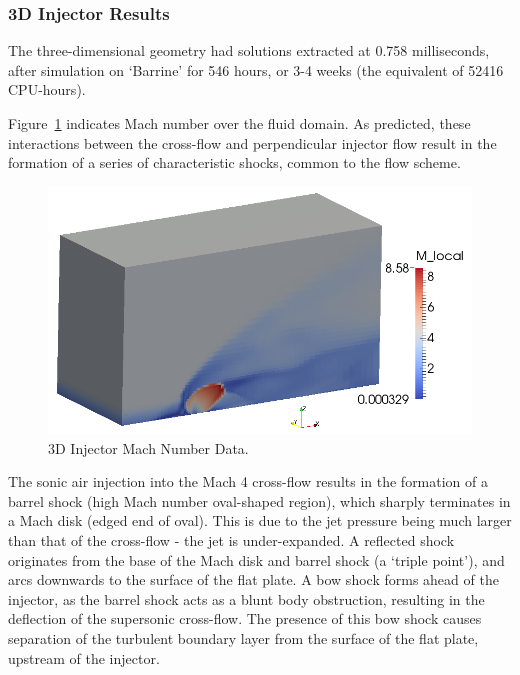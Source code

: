 \newpage
\subsubsection{3D Injector Results}
%
The three-dimensional geometry had solutions extracted at 0.758 milliseconds, after simulation on `Barrine' for 546 hours, or 3-4 weeks (the equivalent of 52416 CPU-hours).

Figure~\ref{f:tc3:injectormach} indicates Mach number over the fluid domain. As predicted, these interactions between the cross-flow and perpendicular injector flow result in the formation of a series of characteristic shocks, common to the flow scheme. 

%
\begin{figure}[htbp]
 \begin{center}
  \includegraphics[width=14cm]{./chap8-3Dinjector/figs/inject-mach.png}
  \caption{3D Injector Mach Number Data.}
  \label{f:tc3:injectormach}
 \end{center}
\end{figure}
%

The sonic air injection into the Mach 4 cross-flow results in the formation of a barrel shock (high Mach number oval-shaped region), which sharply terminates in a Mach disk (edged end of oval). This is due to the jet pressure being much larger than that of the cross-flow - the jet is under-expanded. A reflected shock originates from the base of the Mach disk and barrel shock (a `triple point'), and arcs downwards to the surface of the flat plate. A bow shock forms ahead of the injector, as the barrel shock acts as a blunt body obstruction, resulting in the deflection of the supersonic cross-flow. The presence of this bow shock causes separation of the turbulent boundary layer from the surface of the flat plate, upstream of the injector.

